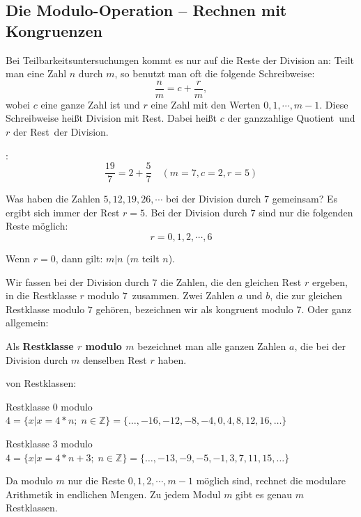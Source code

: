\begin{refsegment}
\subsection{Die Modulo-Operation -- Rechnen mit Kongruenzen} 

Bei Teilbarkeitsuntersuchungen kommt es nur auf die Reste der Division an:
Teilt man eine Zahl $n$ durch $m$, so benutzt man oft die folgende Schreibweise:
$$\frac{n}{m} = c + \frac{r}{m} ,$$
wobei $c$ eine ganze Zahl ist und $r$ eine Zahl mit den Werten $0,1,\cdots,
m-1$.
Diese Schreibweise heißt Division mit Rest. Dabei heißt $c$ der ganzzahlige
\glqq Quotient\grqq~und $r$ der \glqq Rest\grqq~der Division.

\begin{example}{:}
$$\frac{19}{7} = 2 + \frac{5}{7} \quad (m=7, c = 2, r = 5)$$
\end{example}
Was haben die Zahlen $5, 12, 19, 26, \cdots$ bei der Division durch $7$
gemeinsam?
Es ergibt sich immer der Rest $r = 5$.
Bei der Division durch $7$ sind nur die folgenden Reste möglich:
$$r = 0, 1, 2, \cdots, 6$$

Wenn $r = 0$, dann gilt: $m | n$ (\glqq  $m$ teilt $n$\grqq).

Wir fassen bei der Division durch $7$ die Zahlen, die den gleichen Rest $r$
ergeben, in die \glqq Restklasse $r$ modulo $7$\grqq~zusammen. Zwei Zahlen $a$
und $b$, die zur gleichen Restklasse modulo $7$ gehören, bezeichnen wir als
\glqq kongruent modulo 7\grqq. Oder ganz allgemein:

\begin{definition}\label{def-zth-remainder} 
Als \textbf{Restklasse $r$ modulo $m$} bezeichnet man alle ganzen Zahlen $a$, die
bei der Division durch $m$ denselben Rest $r$ haben.
\end{definition}
\newpage
\begin{example}{ von Restklassen:}
\begin{compactitem}
\item[] Restklasse $0$ modulo $4 = \{ x | x = 4*n; \; n \in \mathbb{Z} \} = \{ \dots, -16, -12, -8, -4, 0, 4, 8, 12, 16, \dots \}$
\item[] Restklasse $3$ modulo $4 = \{ x | x = 4*n + 3;\; n \in \mathbb{Z} \} = \{ \dots, -13, -9, -5, -1, 3, 7, 11, 15, \dots \}$
\end{compactitem}
\end{example}
Da modulo $m$ nur die Reste $0, 1, 2, \cdots, m-1$ möglich sind, rechnet die modulare Arithmetik in endlichen Mengen.
Zu jedem Modul $m$ gibt es genau $m$ Restklassen.


\end{refsegment}
